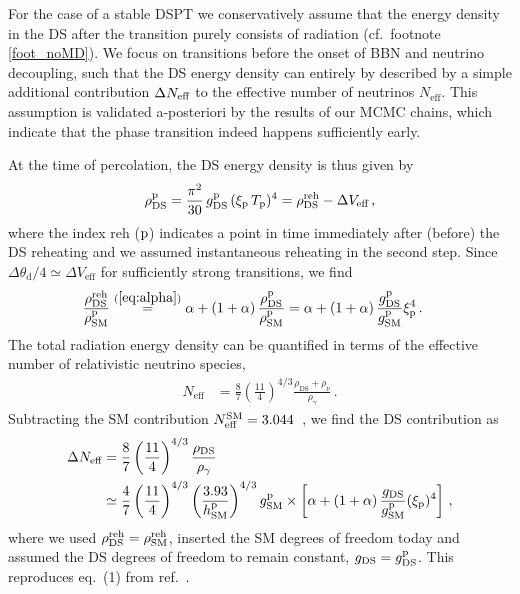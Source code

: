 	For the case of a stable \ac{DSPT} we conservatively assume that the energy density in the \ac{DS} after the transition purely consists of  radiation (cf.~footnote \ref{foot_noMD}). We focus on transitions before the onset of \ac{BBN} and neutrino decoupling, such that the \ac{DS} energy density can entirely by described by a simple additional contribution $\Delta N_\text{eff} $ to the effective number of neutrinos $N_\text{eff}$. This assumption is validated a-posteriori by the results of our \ac{MCMC} chains, which indicate that the phase transition indeed happens sufficiently early.
	
	At the time of percolation, the \ac{DS} energy density is thus given by 
	\begin{align}
		\rho_{\text{DS}}^{\text{p}} = \frac{\pi^2}{30} \, g_{\text{DS}}^{\text{p}} \, (\xi_{\text{p}} \, T_{\text{p}})^4 = \rho_\text{DS}^\text{reh} - \Delta V_\text{eff} \, , \label{eq:cosmo_instant_reheating}
	\end{align} 
	where the index reh ($\text{p}$) indicates a point in time immediately after (before) the \ac{DS} reheating and we assumed instantaneous reheating in the second step. Since $\Delta \theta_\text{d}/4 \simeq \Delta V_\text{eff}$ for sufficiently strong transitions, we find 
	\begin{align}
		\frac{\rho_\text{DS}^\text{reh}}{\rho_\text{SM}^{\text{p}}} &\stackrel{(\ref{eq:alpha})}{=} \alpha +  \left(1 + \alpha\right)\frac{\rho_\text{DS}^{\text{p}}}{\rho_\text{SM}^{\text{p}}} =  \alpha +  \left(1 + \alpha\right)\frac{g_{\text{DS}}^{\text{p}}}{g_{\text{SM}}^{\text{p}}} \xi_{\text{p}}^4 \label{eq:energyratioreh} \, .
	\end{align}
	The total radiation energy density can be quantified in terms of the effective number of relativistic neutrino species,
	\begin{align}
		N_\text{eff} &= \frac{8}{7} \left(\frac{11}{4}\right)^{4/3} \frac{\rho_\text{DS} + \rho_\nu}{\rho_\gamma}\,.
	\end{align}
	Subtracting the SM contribution $N_\mathrm{eff}^{\text{SM}} = 3.044$~\cite{Bennett:2020zkv},  we find the DS contribution as
	\begin{align}
		\Delta N_\text{eff} &= %
		\frac{8}{7} \left(\frac{11}{4}\right)^{4/3} \frac{\rho_\text{DS}}{\rho_\gamma} \\
		&\simeq  \frac{4}{7} \left(\frac{11}{4}\right)^{4/3} \left(\frac{3.93}{h_{\text{SM}}^{\perc}}\right)^{4/3} g_{\text{SM}}^{\perc}  \times \left[\alpha +  \left(1 + \alpha\right)\frac{g_{\DS}}{g_{\text{SM}}^{\perc}} (\xi_\perc)^4\right] \, , \label{eq:Neff}
	\end{align}
	where we used ${\rho_\text{DS}^\text{reh}}={\rho_\text{SM}^{\text{reh}}} $, inserted the SM degrees of freedom today and assumed the DS degrees of freedom to remain constant,  $g_{\text{DS}} = g_{\text{DS}}^{\text{p}}$. This reproduces eq.~(1) from ref.~\cite{Bai:2021ibt}.
	
